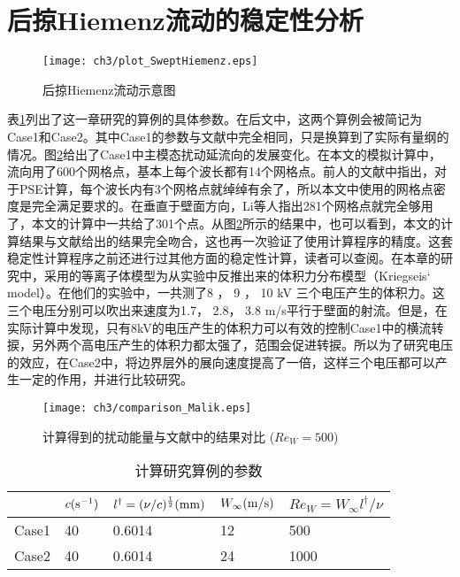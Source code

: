 \section{后掠Hiemenz流动的稳定性分析}
\begin{figure}[htb]
  \centering
  \texttt{[image: ch3/plot\_SweptHiemenz.eps]}\\
  \caption{后掠Hiemenz流动示意图}\label{fig:SweptHiemenz}
\end{figure}
表\ref{t:testcase}列出了这一章研究的算例的具体参数。在后文中，这两个算例会被简记为Case1和Case2。其中Case1的参数与文献\cite{Malik1994}中完全相同，只是换算到了实际有量纲的情况。图\ref{f:Com_Malik1994}给出了Case1中主模态扰动延流向的发展变化。在本文的模拟计算中，流向用了600个网格点，基本上每个波长都有14个网格点。前人的文献中指出，对于PSE计算，每个波长内有3个网格点就绰绰有余了\cite{Joslin1992}，所以本文中使用的网格点密度是完全满足要求的。在垂直于壁面方向，Li等人\cite{Li2015a}指出281个网格点就完全够用了，本文的计算中一共给了301个点。从图\ref{f:Com_Malik1994}所示的结果中，也可以看到，本文的计算结果与文献给出的结果完全吻合，这也再一次验证了使用计算程序的精度。这套稳定性计算程序之前还进行过其他方面的稳定性计算，读者可以查阅\cite{Xu2011a,Xu2011b,Ren2014a,Ren2014b,Ren2014c,Ren2015,Ren2016}。在本章的研究中，采用的等离子体模型为从实验中反推出来的体积力分布模型（Kriegseis` model\cite{kriegseis2013velocity}）。在他们的实验中，一共测了8 ， 9 ， 10 kV 三个电压产生的体积力。这三个电压分别可以吹出来速度为1.7， 2.8， 3.8 m/s平行于壁面的射流。但是，在实际计算中发现，只有8kV的电压产生的体积力可以有效的控制Case1中的横流转捩，另外两个高电压产生的体积力都太强了，范围会促进转捩。所以为了研究电压的效应，在Case2中，将边界层外的展向速度提高了一倍，这样三个电压都可以产生一定的作用，并进行比较研究。
\begin{figure}[htb]
  \centering
  \texttt{[image: ch3/comparison\_Malik.eps]}\\
  \caption{计算得到的扰动能量与文献\cite{Malik1994}中的结果对比 ($Re_W=500$)}\label{f:Com_Malik1994}
\end{figure}
\begin{table}
  \caption{计算研究算例的参数}\label{t:testcase}
  \centering
  \begin{tabular}{p{2.3cm}<{\centering}|p{2.5cm}<{\centering}p{3.5cm}<{\centering}p{2.5cm}<{\centering}p{3.5cm}<{\centering}}%
  \hline
        & $c{\rm (s^{-1})}$ & $l^\dagger=(\nu/c)^{\frac{1}{2}} ({\rm mm})$ & $W_\infty{\rm (m/s)}$ & $Re_W=W_\infty l^\dagger/\nu$ \\
  \hline
  Case1 & 40          & 0.6014            & 12              & 500 \\
  Case2 & 40          & 0.6014            & 24              & 1000 \\
  \hline
  \end{tabular}

\end{table}

